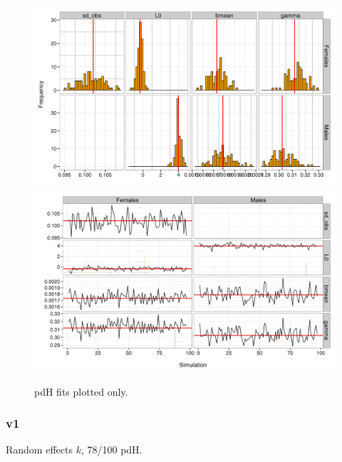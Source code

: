 \documentclass[11pt, a4paper]{article}
\begin{document}
\begin{figure}[!htbp]
  \centering
  \includegraphics[width=\linewidth]{../simulation/v0/results/SimPars.png}
  \includegraphics[width=\linewidth]{../simulation/v0/results/TracePars.png}
  \begin{quote}
    \caption{pdH fits plotted only.}
    \label{fig:sims1}
  \end{quote}
\end{figure}

\newpage\clearpage
\subsubsection{v1}
Random effects $k$, 78/100 pdH.
\end{document}
